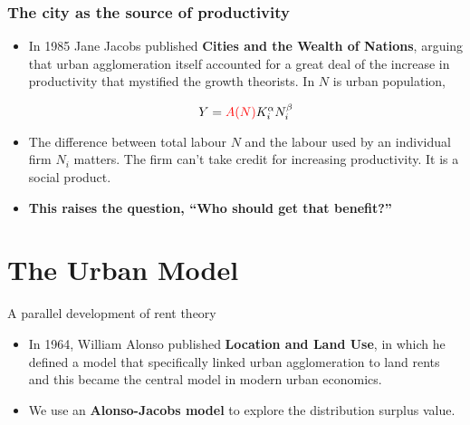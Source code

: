 \documentclass[notes]{beamer}
\begin{document}
\begin{frame}\frametitle{The city as the source of productivity}
\begin{itemize}

\item In 1985 Jane Jacobs published \textbf{Cities and the Wealth of Nations}, arguing that urban agglomeration itself accounted for a great deal of the increase in productivity that mystified the growth theorists. In $N$ is urban population,

\[Y=  \textcolor{red} {A(N)}K_i^\alpha N_i^\beta\]

\item The difference between total labour $N$ and the labour used by an individual firm  $N_i$  matters. The firm can't take credit for increasing productivity. It is a social product.

\item \textbf{This raises the question, ``Who should get that benefit?''}

\end {itemize}

\end{frame}


\section{The Urban Model}%
{A parallel development of rent theory}
\begin{itemize} 

\item In 1964, William Alonso published \textbf{Location and Land Use}, in which he defined a model %
that specifically linked urban agglomeration to land rents and this became the central model in modern urban economics.

\item We use an \textbf{Alonso-Jacobs model} to explore the distribution surplus value.
\end {itemize}
\end{document}
